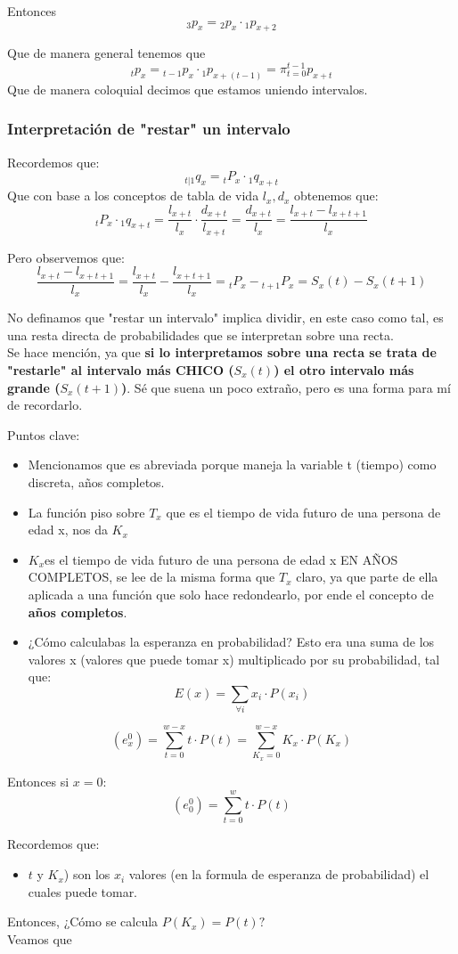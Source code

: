 \documentclass{article}
\begin{document}
Entonces \[{}_3p_x = {}_2p_x \cdot {}_1p_{x+2}\]

Que de manera general tenemos que \[{}_tp_x = {}_{t-1}p_x \cdot {}_1p_{x+(t-1)} = \pi_{t=0}^{t-1} p_{x+t}\]
Que de manera coloquial decimos que estamos uniendo intervalos.

\subsubsection*{Interpretación de "restar" un intervalo}

Recordemos que:
\[{}_{t|1}q_x = {}_{t}P_x \cdot {}_{1}q_{x+t}\]
Que con base a los conceptos de tabla de vida \(l_x, d_x\) obtenemos que:
\[ {}_{t}P_x \cdot {}_{1}q_{x+t} = \frac{l_{x+t}}{l_x} \cdot \frac{d_{x+t}}{l_{x+t}} = \frac{d_{x+t}}{l_x} = \frac{l_{x+t}-l_{x+t+1}}{l_x}\]

Pero observemos que:
\[\frac{l_{x+t}-l_{x+t+1}}{l_x} = \frac{l_{x+t}}{l_x}- \frac{l_{x+t+1}}{l_x} = {}_tP_x - {}_{t+1}P_x = S_x(t)-S_x(t+1)\]

No definamos que "restar un intervalo" implica dividir, en este caso como tal, es una resta directa de probabilidades que se interpretan sobre una recta.
\\
Se hace mención, ya que \textbf{si lo interpretamos sobre una recta se trata de "restarle" al intervalo más CHICO (\(S_x(t)\)) el otro intervalo más grande (\(S_x(t+1)\))}. Sé que suena un poco extraño, pero es una forma para mí de recordarlo.

Puntos clave:
\begin{itemize}
    \item Mencionamos que es abreviada porque maneja la variable t (tiempo) como discreta, años completos.
    \item La función piso sobre \(T_x\) que es el tiempo de vida futuro de una persona de edad x, nos da \(K_x\)
    \item \(K_x\)es el tiempo de vida futuro de una persona de edad x EN AÑOS COMPLETOS, se lee de la misma forma que \(T_x\) claro, ya que parte de ella aplicada a una función que solo hace redondearlo, por ende el concepto de \textbf{años completos}.
    \item ¿Cómo calculabas la esperanza en probabilidad? Esto era una suma de los valores x (valores que puede tomar x) multiplicado por su probabilidad, tal que:
    \[E(x) = \sum_{\forall i} x_i \cdot P(x_i)\]
\end{itemize}

\[(e^0_x) = \sum_{t=0}^{w-x} t \cdot P(t) = \sum_{K_x=0}^{w-x} K_x \cdot P(K_x)\]

Entonces si \(x=0\):
\[(e^0_0) = \sum_{t=0}^{w} t \cdot P(t)\]

Recordemos que:
\begin{itemize}
    \item \(t\) y \(K_x\)) son los \(x_i\) valores (en la formula de esperanza de probabilidad) el cuales puede tomar.
\end{itemize}

Entonces, ¿Cómo se calcula \(P(K_x) = P(t)?\)
\\
Veamos que 
\end{document}
